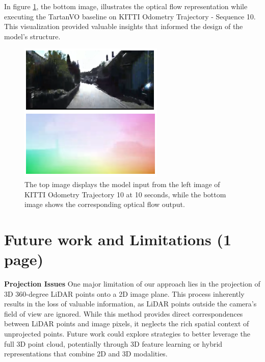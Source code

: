 \documentclass[11pt,a4paper]{article}
\begin{document}
In figure \ref{fig:tartanvo-opticalflow}, the bottom image, illustrates the optical flow representation while executing the TartanVO baseline on KITTI Odometry Trajectory - Sequence 10. This visualization provided valuable insights that informed the design of the model's structure.


\begin{figure}[t]
    \centering
    \includegraphics[width=1.0\linewidth]{Reports/2-Baselines-and-Model-Proposal/images/kitti10--inp_flow_10sec.png}
    \caption{The top image displays the model input from the left image of KITTI Odometry Trajectory 10 at 10 seconds, while the bottom image shows the corresponding optical flow output.}
    \label{fig:tartanvo-opticalflow}
\end{figure}

\clearpage
\section{Future work and Limitations (1 page)}
\textbf{Projection Issues}
One major limitation of our approach lies in the projection of 3D 360-degree LiDAR points onto a 2D image plane. This process inherently results in the loss of valuable information, as LiDAR points outside the camera's field of view are ignored. While this method provides direct correspondences between LiDAR points and image pixels, it neglects the rich spatial context of unprojected points. Future work could explore strategies to better leverage the full 3D point cloud, potentially through 3D feature learning or hybrid representations that combine 2D and 3D modalities.
\end{document}
